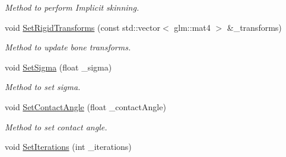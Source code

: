 \begin{DoxyCompactItemize}
\begin{DoxyCompactList}\small\item\em Method to perform Implicit skinning. \end{DoxyCompactList}\item 
void \hyperlink{classImplicitSkinDeformer_a20c918023dd46eb0d3b4df7f9873686c}{Set\+Rigid\+Transforms} (const std\+::vector$<$ glm\+::mat4 $>$ \&\+\_\+transforms)
\begin{DoxyCompactList}\small\item\em Method to update bone transforms. \end{DoxyCompactList}\item 
void \hyperlink{classImplicitSkinDeformer_a2cb0fcbe22e8fec7a7936e68a9f8dc39}{Set\+Sigma} (float \+\_\+sigma)\hypertarget{classImplicitSkinDeformer_a2cb0fcbe22e8fec7a7936e68a9f8dc39}{}\label{classImplicitSkinDeformer_a2cb0fcbe22e8fec7a7936e68a9f8dc39}

\begin{DoxyCompactList}\small\item\em Method to set sigma. \end{DoxyCompactList}\item 
void \hyperlink{classImplicitSkinDeformer_a30df44226d26562db05329f3165af1fd}{Set\+Contact\+Angle} (float \+\_\+contact\+Angle)\hypertarget{classImplicitSkinDeformer_a30df44226d26562db05329f3165af1fd}{}\label{classImplicitSkinDeformer_a30df44226d26562db05329f3165af1fd}

\begin{DoxyCompactList}\small\item\em Method to set contact angle. \end{DoxyCompactList}\item 
void \hyperlink{classImplicitSkinDeformer_af1c7c3fa080c199ce1a559208c543927}{Set\+Iterations} (int \+\_\+iterations)\hypertarget{classImplicitSkinDeformer_af1c7c3fa080c199ce1a559208c543927}{}\label{classImplicitSkinDeformer_af1c7c3fa080c199ce1a559208c543927}


\end{DoxyCompactItemize}
